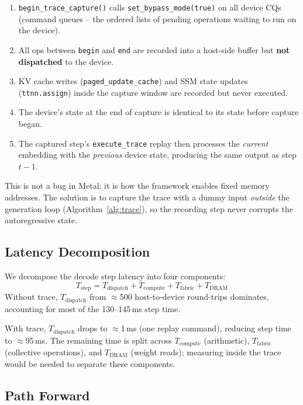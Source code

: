 \begin{enumerate}
\item \texttt{begin\_trace\_capture()} calls \texttt{set\_bypass\_mode(true)} on all device CQs (command queues -- the ordered lists of pending operations waiting to run on the device).
\item All ops between \texttt{begin} and \texttt{end} are recorded into a host-side buffer but \textbf{not dispatched} to the device.
\item KV cache writes (\texttt{paged\_update\_cache}) and SSM state updates (\texttt{ttnn.assign}) inside the capture window are recorded but never executed.
\item The device's state at the end of capture is identical to its state before capture began.
\item The captured step's \texttt{execute\_trace} replay then processes the \emph{current} embedding with the \emph{previous} device state, producing the same output as step $t-1$.
\end{enumerate}

This is not a bug in Metal; it is how the framework enables fixed memory addresses. The solution is to capture the trace with a dummy input \emph{outside} the generation loop (Algorithm~\ref{alg:trace}), so the recording step never corrupts the autoregressive state.

\subsection{Latency Decomposition}

We decompose the decode step latency into four components:
\begin{equation}
T_{\mathrm{step}} = T_{\mathrm{dispatch}} + T_{\mathrm{compute}} + T_{\mathrm{fabric}} + T_{\mathrm{DRAM}}
\label{eq:roofline}
\end{equation}
Without trace, $T_{\mathrm{dispatch}}$ from $\approx$500 host-to-device round-trips dominates, accounting for most of the 130--145\,ms step time.

With trace, $T_{\mathrm{dispatch}}$ drops to $\approx$1\,ms (one replay command), reducing step time to $\approx$95\,ms. The remaining time is split across $T_{\mathrm{compute}}$ (arithmetic), $T_{\mathrm{fabric}}$ (collective operations), and $T_{\mathrm{DRAM}}$ (weight reads); measuring inside the trace would be needed to separate these components.

\subsection{Path Forward}

